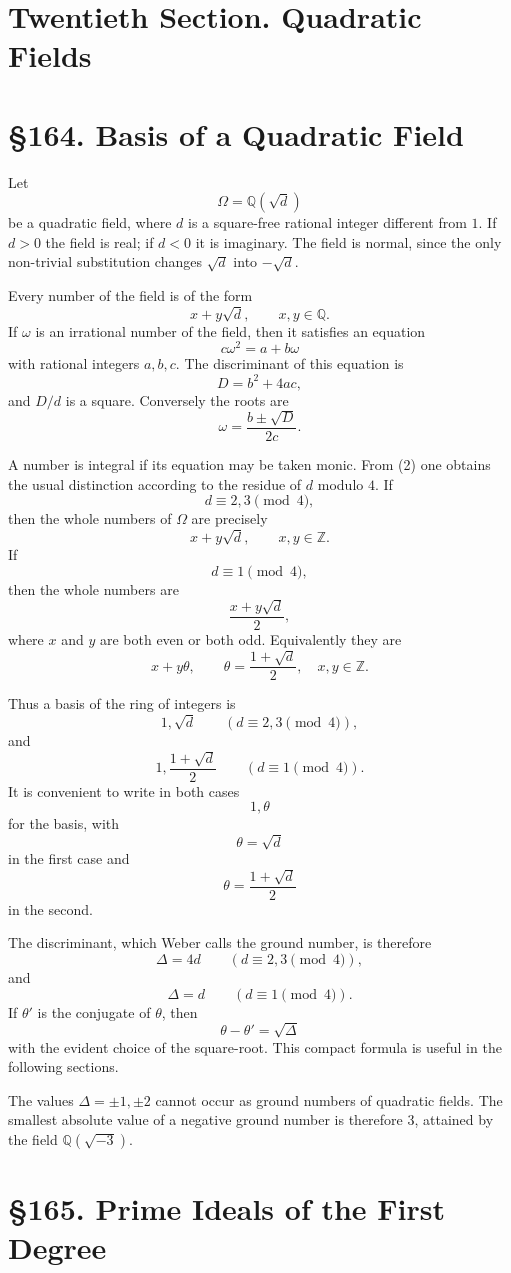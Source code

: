 \documentclass[12pt,a4paper]{article}
\newcommand{\webersection}[2]{\clearpage\section*{\S #1. #2}}
\newcommand{\booktitle}[1]{\clearpage\section*{#1}}
\begin{document}
\booktitle{Twentieth Section. Quadratic Fields}

\webersection{164}{Basis of a Quadratic Field}

Let
\[
  \Omega=\mathbb Q(\sqrt d)
\]
be a quadratic field, where \(d\) is a square-free rational integer different from \(1\).  If \(d>0\) the field is real; if \(d<0\) it is imaginary.  The field is normal, since the only non-trivial substitution changes \(\sqrt d\) into \(-\sqrt d\).

Every number of the field is of the form
\[
  x+y\sqrt d,\qquad x,y\in\mathbb Q.
\]
If \(\omega\) is an irrational number of the field, then it satisfies an equation
\[
  c\omega^2=a+b\omega
\tag{1}
\]
with rational integers \(a,b,c\).  The discriminant of this equation is
\[
  D=b^2+4ac,
\]
and \(D/d\) is a square.  Conversely the roots are
\[
  \omega=\frac{b\pm\sqrt D}{2c}.
\tag{2}
\]

A number is integral if its equation may be taken monic.  From (2) one obtains the usual distinction according to the residue of \(d\) modulo \(4\).  If
\[
  d\equiv2,3\pmod4,
\]
then the whole numbers of \(\Omega\) are precisely
\[
  x+y\sqrt d,\qquad x,y\in\mathbb Z.
\tag{3}
\]
If
\[
  d\equiv1\pmod4,
\]
then the whole numbers are
\[
  \frac{x+y\sqrt d}{2},
\]
where \(x\) and \(y\) are both even or both odd.  Equivalently they are
\[
  x+y\theta,\qquad \theta=\frac{1+\sqrt d}{2},\quad x,y\in\mathbb Z.
\tag{4}
\]

Thus a basis of the ring of integers is
\[
  1,\sqrt d\qquad (d\equiv2,3\pmod4),
\tag{5a}
\]
and
\[
  1,\frac{1+\sqrt d}{2}\qquad (d\equiv1\pmod4).
\tag{5b}
\]
It is convenient to write in both cases
\[
  1,\theta
\]
for the basis, with
\[
  \theta=\sqrt d
\]
in the first case and
\[
  \theta=\frac{1+\sqrt d}{2}
\]
in the second.

The discriminant, which Weber calls the ground number, is therefore
\[
  \Delta=4d\qquad (d\equiv2,3\pmod4),
\tag{6a}
\]
and
\[
  \Delta=d\qquad (d\equiv1\pmod4).
\tag{6b}
\]
If \(\theta'\) is the conjugate of \(\theta\), then
\[
  \theta-\theta'=\sqrt\Delta
\tag{7}
\]
with the evident choice of the square-root.  This compact formula is useful in the following sections.

The values \(\Delta=\pm1,\pm2\) cannot occur as ground numbers of quadratic fields.  The smallest absolute value of a negative ground number is therefore \(3\), attained by the field \(\mathbb Q(\sqrt{-3})\).

\webersection{165}{Prime Ideals of the First Degree}
\end{document}

